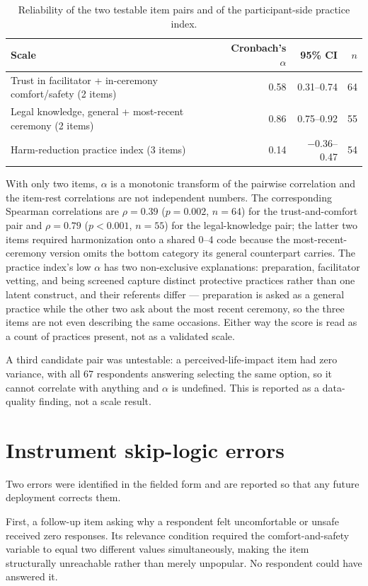 \documentclass[12pt]{article}
\begin{document}
\begin{table}[htbp]
\centering
\caption{Reliability of the two testable item pairs and of the participant-side practice index.}
\begin{tabular}{lrrr}
\toprule
Scale & Cronbach's $\alpha$ & 95\% CI & $n$ \\
\midrule
Trust in facilitator + in-ceremony comfort/safety (2 items) & 0.58 & 0.31--0.74 & 64 \\
Legal knowledge, general + most-recent ceremony (2 items) & 0.86 & 0.75--0.92 & 55 \\
Harm-reduction practice index (3 items) & 0.14 & $-0.36$--0.47 & 54 \\
\bottomrule
\end{tabular}
\end{table}

\noindent
With only two items, $\alpha$ is a monotonic transform of the pairwise correlation and the item-rest
correlations are not independent numbers. The corresponding Spearman correlations are $\rho=0.39$
($p=0.002$, $n=64$) for the trust-and-comfort pair and $\rho=0.79$ ($p<0.001$, $n=55$) for the
legal-knowledge pair; the latter two items required harmonization onto a shared 0--4 code because the
most-recent-ceremony version omits the bottom category its general counterpart carries. The practice
index's low $\alpha$ has two non-exclusive explanations: preparation, facilitator vetting, and being
screened capture distinct protective practices rather than one latent construct, and their referents differ
--- preparation is asked as a general practice while the other two ask about the most recent ceremony, so
the three items are not even describing the same occasions. Either way the score is read as a count of
practices present, not as a validated scale.

A third candidate pair was untestable: a perceived-life-impact item had zero variance, with all 67
respondents answering selecting the same option, so it cannot correlate with anything and $\alpha$ is
undefined. This is reported as a data-quality finding, not a scale result.

\section{Instrument skip-logic errors}
\label{sec:logic}

Two errors were identified in the fielded form and are reported so that any future deployment corrects
them.

First, a follow-up item asking why a respondent felt uncomfortable or unsafe received zero responses. Its
relevance condition required the comfort-and-safety variable to equal two different values simultaneously,
making the item structurally unreachable rather than merely unpopular. No respondent could have answered
it.
\end{document}
